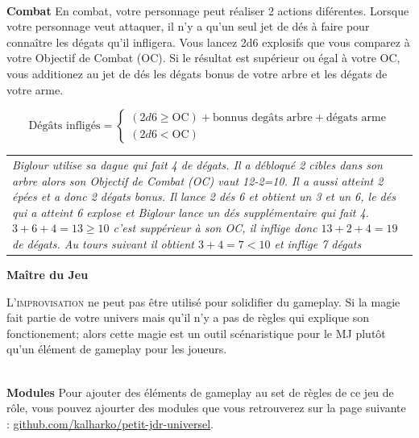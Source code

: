 \documentclass[11pt]{article} %
\newcommand{\enluminure}[2]{\lettrine[lines=3]{\small \initfamily #1}{#2}}
\newcommand{\myjump}[1][1]{\mbox{}\\[#1cm]}
\begin{document}
\myjump[0]
\textbf{Combat}\newline
En combat, votre personnage peut réaliser 2 actions diférentes.
Lorsque votre personnage veut attaquer, il n'y a qu'un seul jet de dés à faire pour connaître les dégats qu'il infligera. Vous lancez 2d6 explosifs que vous comparez à votre Objectif de Combat (OC). Si le résultat est supérieur ou égal à  votre OC, vous additionez au jet de dés les dégats bonus de votre arbre et les dégats de votre arme.

$$
\mbox{Dégâts infligés} =
\left\{
    \begin{array}{ll}
        (2d6 \ge \mbox{OC}) + \mbox{bonnus degâts arbre} + \mbox{dégats arme}\\
(2d6 < \mbox{OC})
    \end{array}
\right.
$$

\noindent
\begin{tabularx}{\linewidth}{|X}
\emph{Biglour utilise sa dague qui fait 4 de dégats. Il a débloqué 2 cibles dans son arbre alors son Objectif de Combat (OC) vaut 12-2=10. Il a aussi atteint 2 épées et a donc 2 dégats bonus.
Il lance 2 dés 6 et obtient un 3 et un 6, le dés qui a atteint 6 explose et Biglour lance un dés supplémentaire qui fait 4. $3 + 6 + 4 = 13 \ge 10$ c'est suppérieur à son OC, il inflige donc $13 + 2 + 4 = 19$ de dégats. Au tours suivant il obtient $3 + 4 = 7 < 10$ et inflige 7 dégats}\\
\end{tabularx}










\newpage
\textbf{\huge Maître du Jeu}

\enluminure{L}{'improvisation} ne peut pas être utilisé pour solidifier du gameplay. Si la magie fait partie de votre univers mais qu'il n'y a pas de règles qui explique son fonctionement; alors cette magie est un outil scénaristique pour le MJ plutôt qu'un élément de gameplay pour les joueurs.

\myjump[0]
\textbf{Modules}\newline
\noindent Pour ajouter des éléments de gameplay au set de règles de ce jeu de rôle, vous pouvez ajourter des modules que vous retrouverez sur la page suivante : \href{https://github.com/kalharko/petit-jdr-universel}{github.com/kalharko/petit-jdr-universel}.
\end{document}
